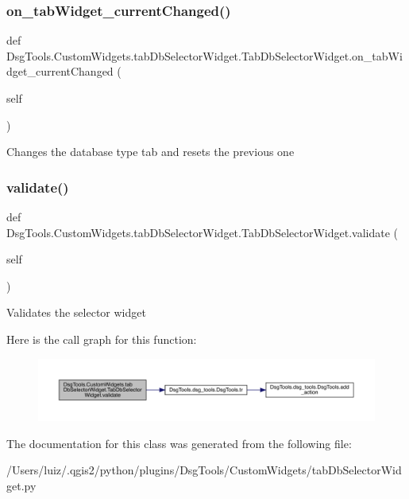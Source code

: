 \subsubsection{\texorpdfstring{on\+\_\+tab\+Widget\+\_\+current\+Changed()}{on\_tabWidget\_currentChanged()}}
{\footnotesize\ttfamily def Dsg\+Tools.\+Custom\+Widgets.\+tab\+Db\+Selector\+Widget.\+Tab\+Db\+Selector\+Widget.\+on\+\_\+tab\+Widget\+\_\+current\+Changed (\begin{DoxyParamCaption}\item[{}]{self }\end{DoxyParamCaption})}

\begin{DoxyVerb}Changes the database type tab and resets the previous one
\end{DoxyVerb}
 \mbox{\label{class_dsg_tools_1_1_custom_widgets_1_1tab_db_selector_widget_1_1_tab_db_selector_widget_a2f6226412b0879e7c06418254f7415d9}} 
\subsubsection{\texorpdfstring{validate()}{validate()}}
{\footnotesize\ttfamily def Dsg\+Tools.\+Custom\+Widgets.\+tab\+Db\+Selector\+Widget.\+Tab\+Db\+Selector\+Widget.\+validate (\begin{DoxyParamCaption}\item[{}]{self }\end{DoxyParamCaption})}

\begin{DoxyVerb}Validates the selector widget
\end{DoxyVerb}
 Here is the call graph for this function\+:
\nopagebreak
\begin{figure}[H]
\begin{center}
\leavevmode
\includegraphics[width=350pt]{class_dsg_tools_1_1_custom_widgets_1_1tab_db_selector_widget_1_1_tab_db_selector_widget_a2f6226412b0879e7c06418254f7415d9_cgraph}
\end{center}
\end{figure}


The documentation for this class was generated from the following file\+:\begin{DoxyCompactItemize}
\item 
/\+Users/luiz/.\+qgis2/python/plugins/\+Dsg\+Tools/\+Custom\+Widgets/tab\+Db\+Selector\+Widget.\+py\end{DoxyCompactItemize}
